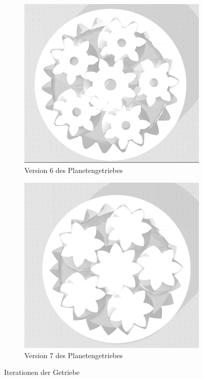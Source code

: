 \begin{figure}[!ht]
	\begin{subfigure}[b]{0.4\textwidth}
		\includegraphics[width=\textwidth]{bilder/GetriebeVersion4-3.png}
		\caption{Version 6 des Planetengetriebes}
		\label{bild:gearversion4-3}
	\end{subfigure}
	\hspace{0.1\textwidth}%
	\begin{subfigure}[b]{0.4\textwidth}
		\includegraphics[width=\textwidth]{bilder/GetriebeVersion4-4.png}
		\caption{Version 7 des Planetengetriebes}
		\label{bild:gearversion4-4}
	\end{subfigure}

	\caption{Iterationen der Getriebe}
\end{figure}

